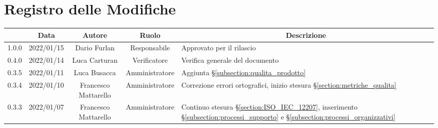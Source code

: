 \thispagestyle{empty}
\section*{Registro delle Modifiche}

\begin{center}
	\renewcommand{\arraystretch}{1.8}
	\begin{longtable}[c]{c | c | c | c | p{5cm}}
		\rowcolor[HTML]{125E28}
		\multicolumn{1}{c}{\color[HTML]{FFFFFF} \textbf{Versione}} &
		\multicolumn{1}{c}{\color[HTML]{FFFFFF} \textbf{Data}}     &
		\multicolumn{1}{c}{\color[HTML]{FFFFFF} \textbf{Autore}}   &
		\multicolumn{1}{c}{\color[HTML]{FFFFFF} \textbf{Ruolo}}    &
		\multicolumn{1}{c}{\color[HTML]{FFFFFF} \textbf{Descrizione}}                                                                                                                                                                                               \\
		\endhead
		1.0.0                                                      & 2022/01/15 & Dario Furlan         & Responsabile   & Approvato per il rilascio                                                                                                                 \\
		0.4.0                                                      & 2022/01/14 & Luca Carturan        & Verificatore   & Verifica generale del documento                                                                                                           \\
		0.3.5                                                      & 2022/01/11 & Luca Busacca         & Amministratore & Aggiunta §\ref{subsection:qualita_prodotto}                                                                                               \\
		0.3.4                                                      & 2022/01/10 & Francesco Mattarello & Amministratore & Correzione errori ortografici, inizio stesura §\ref{section:metriche_qualita}                                                             \\
		0.3.3                                                      & 2022/01/07 & Francesco Mattarello & Amministratore & Continuo stesura §\ref{section:ISO_IEC_12207}, inserimento §\ref{subsection:processi_supporto} e §\ref{subsection:processi_organizzativi} \\

\end{longtable}
\end{center}
